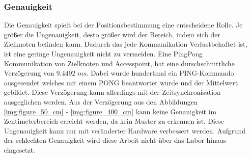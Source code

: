 \subsubsection{Genauigkeit}
Die Genauigkeit spielt bei der Positionsbestimmung eine entscheidene Rolle. Je größer die Ungenauigkeit, desto größer wird der Bereich, indem sich der Zielknoten befinden kann. Dadurch das jede Kommunikation Verlustbehaftet ist, ist eine geringe Ungenauigkeit nicht zu vermeiden. Eine PingPong Kommunikation von Zielknoten und Accesspoint, hat eine durschschnittliche Verzögerung von $9.4492\; ms$. Dabei wurde hundertmal ein \si{PING}-Kommando ausgesendet welches mit einem \si{PONG} beantwortet wurde und der Mittelwert gebildet. Diese Verzögerung kann allerdings mit der Zeitsynchronisation ausgeglichen werden. Aus der Verzögerung aus den Abbildungen \ref{img:figure_50_cm} - \ref{img:figure_400_cm} kann keine Genauigkeit im Zentimeterbereich erreicht werden, da kein Muster zu erkennen ist. Diese Ungenauigkeit kann nur mit veränderter Hardware verbessert werden. Aufgrund der schlechten Genauigkeit wird diese Arbeit nicht über das Labor hinaus eingesetzt.  



